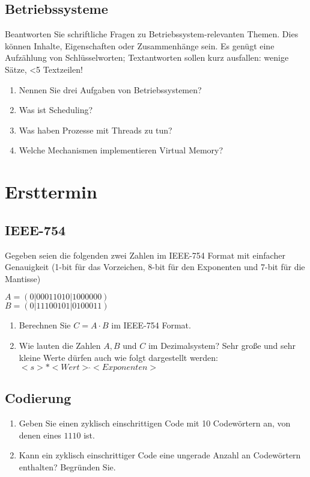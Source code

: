 \documentclass{exercisesheet}
\begin{document}
\subsection{Betriebssysteme}
Beantworten Sie schriftliche Fragen zu Betriebssystem-relevanten Themen. Dies können Inhalte, Eigenschaften oder Zusammenhänge sein. Es genügt eine Aufzählung von Schlüsselworten; Textantworten sollen kurz ausfallen: wenige Sätze, <5 Textzeilen!
\begin{enumerate}
  \item Nennen Sie drei Aufgaben von Betriebssystemen?
  \item Was ist Scheduling?
  \item Was haben Prozesse mit Threads zu tun?
  \item Welche Mechanismen implementieren Virtual Memory?
\end{enumerate}

\section{Ersttermin}
\setcounter{subsection}{3}
\subsection{IEEE-754}
Gegeben seien die folgenden zwei Zahlen im IEEE-754 Format mit einfacher Genauigkeit (1-bit für das Vorzeichen, 8-bit für den Exponenten und 7-bit für die Mantisse)
\begin{center}
  $A = (0|00011010|1000000)$\\
  $B = (0|11100101|0100011)$
\end{center}
\begin{enumerate}
  \item Berechnen Sie $C = A \cdot B$ im IEEE-754 Format.
  \item Wie lauten die Zahlen $A, B$ und $C$ im Dezimalsystem? Sehr große und sehr kleine Werte dürfen auch wie folgt dargestellt werden: $<s>*<Wert> \hat{} <Exponenten>$
\end{enumerate}

\subsection{Codierung}
\begin{enumerate}
  \item Geben Sie einen zyklisch einschrittigen Code mit 10 Codewörtern an, von denen eines $1110$ ist.
  \item Kann ein zyklisch einschrittiger Code eine ungerade Anzahl an Codewörtern enthalten? Begründen Sie.
\end{enumerate}
\end{document}
